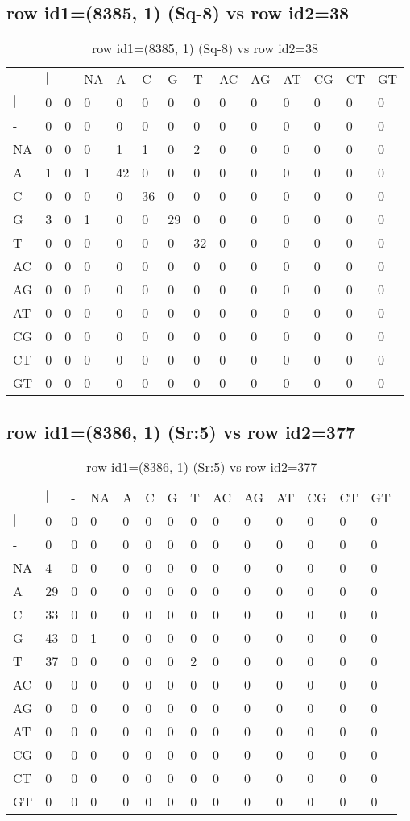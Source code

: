 \subsection{row id1=(8385, 1) (Sq-8) vs row id2=38}
\begin{center}
\begin{longtable}{|l|l|l|l|l|l|l|l|l|l|l|l|l|l|}
\caption{row id1=(8385, 1) (Sq-8) vs row id2=38} \label{table_dm626}\\
\hline
\\
\hline
&$|$&-&NA&A&C&G&T&AC&AG&AT&CG&CT&GT\\
$|$&0&0&0&0&0&0&0&0&0&0&0&0&0\\
-&0&0&0&0&0&0&0&0&0&0&0&0&0\\
NA&0&0&0&1&1&0&2&0&0&0&0&0&0\\
A&1&0&1&42&0&0&0&0&0&0&0&0&0\\
C&0&0&0&0&36&0&0&0&0&0&0&0&0\\
G&3&0&1&0&0&29&0&0&0&0&0&0&0\\
T&0&0&0&0&0&0&32&0&0&0&0&0&0\\
AC&0&0&0&0&0&0&0&0&0&0&0&0&0\\
AG&0&0&0&0&0&0&0&0&0&0&0&0&0\\
AT&0&0&0&0&0&0&0&0&0&0&0&0&0\\
CG&0&0&0&0&0&0&0&0&0&0&0&0&0\\
CT&0&0&0&0&0&0&0&0&0&0&0&0&0\\
GT&0&0&0&0&0&0&0&0&0&0&0&0&0\\
\hline
\end{longtable}
\end{center}

\subsection{row id1=(8386, 1) (Sr:5) vs row id2=377}
\begin{center}
\begin{longtable}{|l|l|l|l|l|l|l|l|l|l|l|l|l|l|}
\caption{row id1=(8386, 1) (Sr:5) vs row id2=377} \label{table_dm628}\\
\hline
\\
\hline
&$|$&-&NA&A&C&G&T&AC&AG&AT&CG&CT&GT\\
$|$&0&0&0&0&0&0&0&0&0&0&0&0&0\\
-&0&0&0&0&0&0&0&0&0&0&0&0&0\\
NA&4&0&0&0&0&0&0&0&0&0&0&0&0\\
A&29&0&0&0&0&0&0&0&0&0&0&0&0\\
C&33&0&0&0&0&0&0&0&0&0&0&0&0\\
G&43&0&1&0&0&0&0&0&0&0&0&0&0\\
T&37&0&0&0&0&0&2&0&0&0&0&0&0\\
AC&0&0&0&0&0&0&0&0&0&0&0&0&0\\
AG&0&0&0&0&0&0&0&0&0&0&0&0&0\\
AT&0&0&0&0&0&0&0&0&0&0&0&0&0\\
CG&0&0&0&0&0&0&0&0&0&0&0&0&0\\
CT&0&0&0&0&0&0&0&0&0&0&0&0&0\\
GT&0&0&0&0&0&0&0&0&0&0&0&0&0\\
\hline
\end{longtable}
\end{center}

